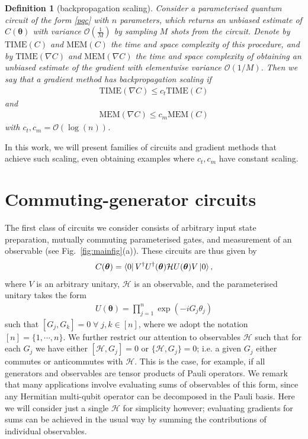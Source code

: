 \documentclass[a4paper,twocolumn,11pt]{quantumarticle}
\newtheorem{definition}{Definition}[section]
\renewcommand{\vec}{\boldsymbol}
\begin{document}
\begin{definition}[backpropagation scaling]
    Consider a parameterised quantum circuit of the form \eqref{pqc} with $n$ parameters, which returns an unbiased estimate of $C(\vec{\theta})$ with variance $\mathcal{O}(\frac{1}{M})$ by sampling $M$ shots from the circuit. Denote by $\text{TIME}(C)$ and $\text{MEM}(C)$ the time and space complexity of this procedure, and by $\text{TIME}(\nabla C)$ and $\text{MEM}(\nabla C)$ the time and space complexity of obtaining an unbiased estimate of the gradient with elementwise variance $\mathcal{O}(1/M)$.
    Then we say that a gradient method has backpropagation scaling if 
    \begin{align}
        \text{TIME}(\nabla C)\leq c_t \text{TIME}(C)
    \end{align}
    and 
    \begin{align}
        \text{MEM}(\nabla C)\leq c_m \text{MEM}(C)
    \end{align}
    with $c_t,c_m= \mathcal{O}(\log(n))$.
\end{definition}

In this work, we will present families of circuits and gradient methods that achieve such scaling, even obtaining examples where $c_t,c_m$ have constant scaling. 

\section{Commuting-generator circuits}\label{sec:commuting}
The first class of circuits we consider consists of arbitrary input state preparation, mutually commuting parameterised gates, and measurement of an observable (see Fig.\ \ref{fig:mainfig}(a)). These circuits are thus given by 
%
\begin{align}\label{ansatz}
    C(\vec{\theta}) = \bra{0}V^\dagger U^{\dagger}(\vec{\theta})\mathcal{H}U(\vec{\theta}) V\ket{0},
\end{align}
%
where $V$ is an arbitrary unitary, $\mathcal{H}$ is an observable, and the parameterised unitary takes the form 
%
\begin{align}
    U(\vec{\theta})=\prod_{j=1}^n \exp(-iG_j\theta_j)
\end{align}
%
such that $[G_j,G_k]=0\;\forall\;j,k\in[n]$, where we adopt the notation $[n] = \{1,\cdots,n\}$. We further restrict our attention to observables $\mathcal{H}$ such that for each $G_j$ we have either $[\mathcal{H},G_j]=0$ or $\{\mathcal{H},G_j\}=0$; i.e. a given $G_j$ either commutes or anticommutes with $\mathcal{H}$. This is the case, for example, if all generators and observables are tensor products of Pauli operators. We remark that many applications involve evaluating sums of observables of this form, since any Hermitian multi-qubit operator can be decomposed in the Pauli basis. Here we will consider just a single $\mathcal{H}$ for simplicity however; evaluating gradients for sums can be achieved in the usual way by summing the contributions of individual observables. 
\end{document}
